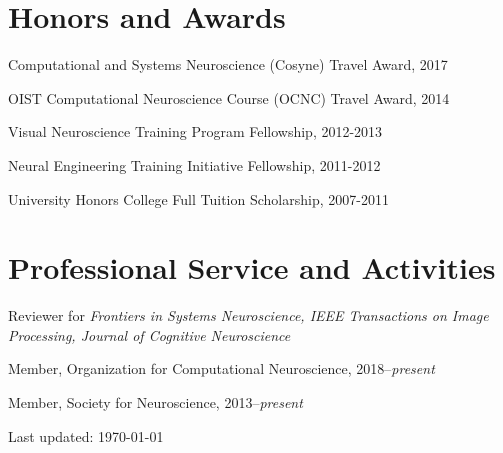\documentclass[10pt,letterpaper]{article}
\def\footerlink{} %
\renewenvironment{itemize}{
  \begin{list}{}{
    \setlength{\leftmargin}{1.5em}
    \setlength{\itemsep}{0.25em}
    \setlength{\parskip}{0pt}
    \setlength{\parsep}{0.25em}
  }
}{
  \end{list}
}
\begin{document}
\vspace{-0.25in}

\section*{Honors and Awards}
\vspace{-0.05in}
\begin{itemize}
  \setlength\itemsep{1pt}
  \item Computational and Systems Neuroscience (Cosyne) Travel Award, 2017
  \item OIST Computational Neuroscience Course (OCNC) Travel Award, 2014
  \item Visual Neuroscience Training Program Fellowship, 2012-2013
  \item Neural Engineering Training Initiative Fellowship, 2011-2012
  \item University Honors College Full Tuition Scholarship, 2007-2011
\end{itemize}

\vspace{-0.25in}

\section*{Professional Service and Activities}
\vspace{-0.05in}
\begin{itemize}
  \setlength\itemsep{1pt}
  \item Reviewer for \textit{Frontiers in Systems Neuroscience, IEEE Transactions on Image Processing, Journal of Cognitive Neuroscience}
  \item Member, Organization for Computational Neuroscience, 2018--\textit{present}
  \item Member, Society for Neuroscience, 2013--\textit{present}
\end{itemize}

\bigskip

\begin{center}
  \begin{footnotesize}
    Last updated: \today \\
    \href{\footerlink}{\texttt{\footerlink}}
  \end{footnotesize}
\end{center}
\end{document}
